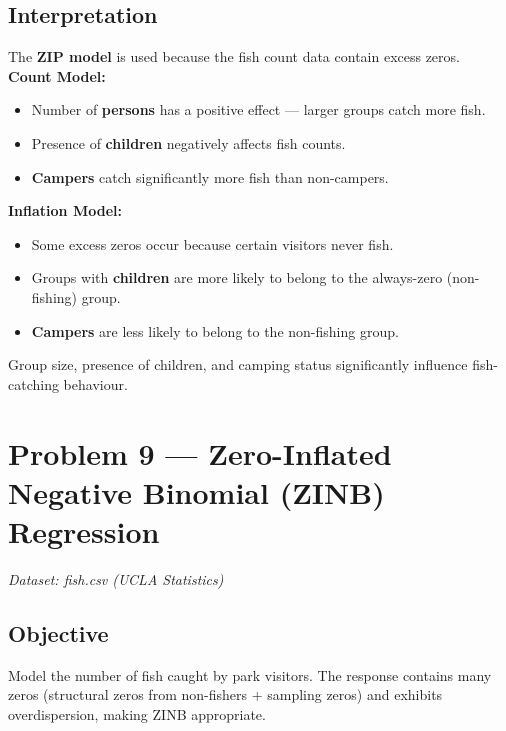 \documentclass[12pt,a4paper]{article}
\begin{document}
\subsection{Interpretation}

\begin{interpbox}
The \textbf{ZIP model} is used because the fish count data contain excess zeros.\\[4pt]
\textbf{Count Model:}
\begin{itemize}[noitemsep]
  \item Number of \textbf{persons} has a positive effect — larger groups catch more fish.
  \item Presence of \textbf{children} negatively affects fish counts.
  \item \textbf{Campers} catch significantly more fish than non-campers.
\end{itemize}
\textbf{Inflation Model:}
\begin{itemize}[noitemsep]
  \item Some excess zeros occur because certain visitors never fish.
  \item Groups with \textbf{children} are more likely to belong to the always-zero (non-fishing) group.
  \item \textbf{Campers} are less likely to belong to the non-fishing group.
\end{itemize}
Group size, presence of children, and camping status significantly influence fish-catching behaviour.
\end{interpbox}

\newpage
\section{Problem 9 — Zero-Inflated Negative Binomial (ZINB) Regression}

\textit{Dataset: fish.csv (UCLA Statistics)}

\subsection{Objective}
Model the number of fish caught by park visitors. The response contains many zeros (structural zeros from non-fishers + sampling zeros) and exhibits overdispersion, making ZINB appropriate.
\end{document}

